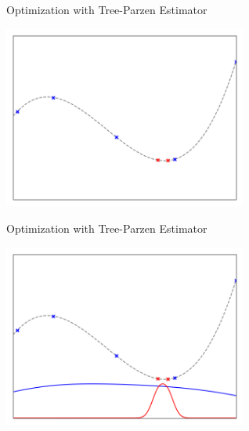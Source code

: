\begin{frame}[c]{Optimization with Tree-Parzen Estimator}

\centering
\includegraphics[width=0.6\textwidth]{w07_hpo_grey_box/images/tpe/tpeiter_3_observations.png}


\end{frame}
\begin{frame}[c]{Optimization with Tree-Parzen Estimator}

\centering
\includegraphics[width=0.6\textwidth]{w07_hpo_grey_box/images/tpe/tpeiter_3_pdfs.png}


\end{frame}
